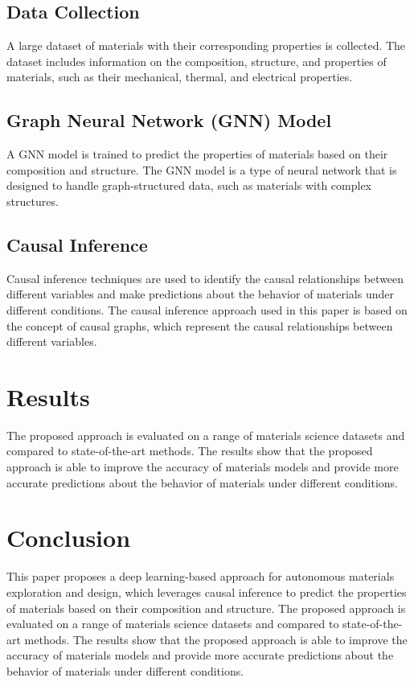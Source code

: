 \documentclass{article}
\begin{document}
\subsection{Data Collection}

A large dataset of materials with their corresponding properties is collected. The dataset includes information on the composition, structure, and properties of materials, such as their mechanical, thermal, and electrical properties.

\subsection{Graph Neural Network (GNN) Model}

A GNN model is trained to predict the properties of materials based on their composition and structure. The GNN model is a type of neural network that is designed to handle graph-structured data, such as materials with complex structures.

\subsection{Causal Inference}

Causal inference techniques are used to identify the causal relationships between different variables and make predictions about the behavior of materials under different conditions. The causal inference approach used in this paper is based on the concept of causal graphs, which represent the causal relationships between different variables.

\section{Results}

The proposed approach is evaluated on a range of materials science datasets and compared to state-of-the-art methods. The results show that the proposed approach is able to improve the accuracy of materials models and provide more accurate predictions about the behavior of materials under different conditions.

\section{Conclusion}

This paper proposes a deep learning-based approach for autonomous materials exploration and design, which leverages causal inference to predict the properties of materials based on their composition and structure. The proposed approach is evaluated on a range of materials science datasets and compared to state-of-the-art methods. The results show that the proposed approach is able to improve the accuracy of materials models and provide more accurate predictions about the behavior of materials under different conditions.
\end{document}
